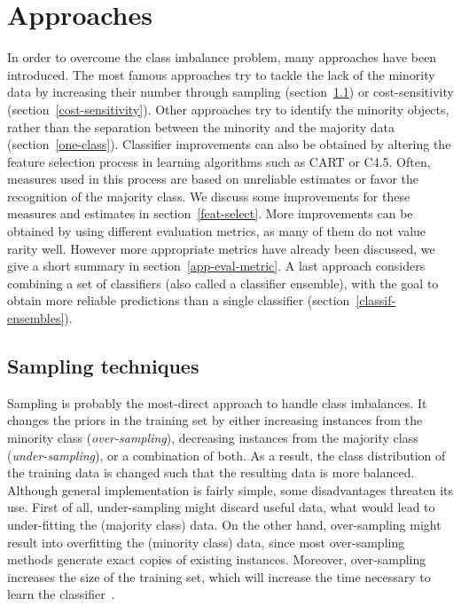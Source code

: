 \section{Approaches}\label{approaches}
In order to overcome the class imbalance problem, many approaches have been introduced. The most famous approaches try to tackle the lack of the minority data by increasing their number through sampling (section~\ref{sampling-techniques}) or cost-sensitivity (section~\ref{cost-sensitivity}). Other approaches try to identify the minority objects, rather than the separation between the minority and the majority data (section~\ref{one-class}). Classifier improvements can also be obtained by altering the feature selection process in learning algorithms such as CART or C4.5. Often, measures used in this process are based on unreliable estimates or favor the recognition of the majority class. We discuss some improvements for these measures and estimates in section~\ref{feat-select}. More improvements can be obtained by using different evaluation metrics, as many of them do not value rarity well. However more appropriate metrics have already been discussed, we give a short summary in section~\ref{app-eval-metric}. A last approach considers combining a set of classifiers (also called a classifier ensemble), with the goal to obtain more reliable predictions than a single classifier (section~\ref{classif-ensembles}). 



\subsection{Sampling techniques}\label{sampling-techniques} 
Sampling is probably the most-direct approach to handle class imbalances. It changes the priors in the training set by either increasing instances from the minority class (\textit{over-sampling}), decreasing instances from the majority class (\textit{under-sampling}), or a combination of both. As a result, the class distribution of the training data is changed such that the resulting data is more balanced. Although general implementation is fairly simple, some disadvantages threaten its use.  First of all, under-sampling might discard useful data, what would lead to under-fitting the (majority class) data. On the other hand, over-sampling might result into overfitting the (minority class) data, since most over-sampling methods generate exact copies of existing instances. Moreover, over-sampling increases the size of the training set, which will increase the time necessary to learn the classifier~\cite{mccarthy}.

